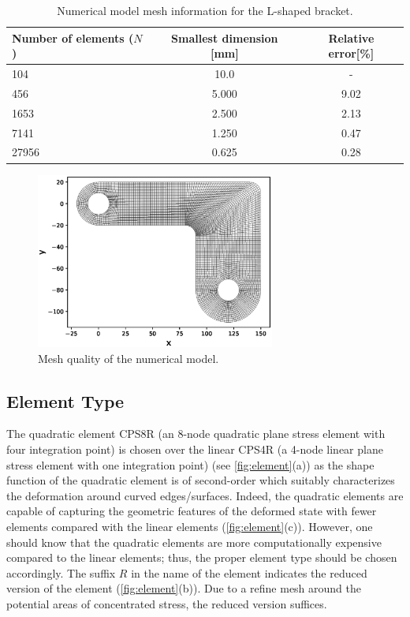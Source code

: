 \documentclass{article}
\begin{document}
\begin{table}[H]
    \centering
    \caption{Numerical model mesh information for the L-shaped bracket.}
    \begin{tabular}{l c c} \hline
        Number of elements ($N$) & Smallest dimension [mm] & Relative error[\%] \\ \hline
        104 & 10.0 & - \\
        456 & 5.000 & 9.02 \\
        1653 & 2.500 & 2.13 \\
        7141 & 1.250 & 0.47 \\
        27956 & 0.625 & 0.28 \\ \hline
    \end{tabular} 
    \label{tab:mesh_convergence}
\end{table}

\begin{figure}[ht]
    \centering
    \includegraphics[width = 0.7\textwidth ]{figures/frame_mesh_quality.eps}
    \caption{Mesh quality of the numerical model.}
    \label{fig:mesh_quality}
\end{figure}

\subsection{Element Type}
The quadratic element CPS8R (an 8-node quadratic plane stress element with four integration point) is chosen over the linear CPS4R (a 4-node linear plane stress element with one integration point) (see \cref{fig:element}(a)) as the shape function of the quadratic element is of second-order which suitably characterizes the deformation around curved edges/surfaces. Indeed, the quadratic elements are capable of capturing the geometric features of the deformed state with fewer elements compared with the linear elements (\cref{fig:element}(c)). However, one should know that the quadratic elements are more computationally expensive compared to the linear elements; thus, the proper element type should be chosen accordingly. The suffix $R$ in the name of the element indicates the reduced version of the element (\cref{fig:element}(b)). Due to a refine mesh around the potential areas of concentrated stress, the reduced version suffices. 
\end{document}
